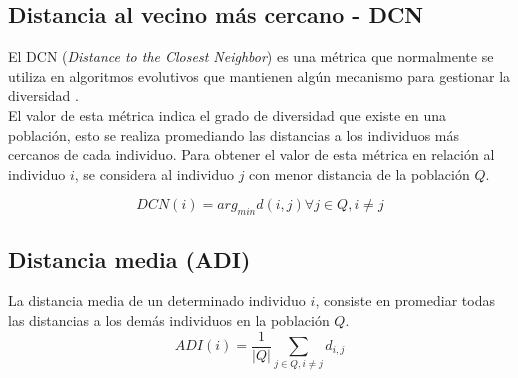 \subsection{Distancia al vecino más cercano - DCN}
El DCN (\textit{Distance to the Closest Neighbor}) es una métrica que normalmente se utiliza en algoritmos evolutivos que mantienen algún mecanismo para gestionar la diversidad \citep{Joel:DCN, Joel:MultiDynamic}.\\
El valor de esta métrica indica el grado de diversidad que existe en una población, esto se realiza promediando las distancias a los individuos más cercanos de cada individuo.
Para obtener el valor de esta métrica en relación al individuo $i$, se considera al individuo $j$ con menor distancia de la población $Q$.

\begin{equation}
DCN(i) = arg_{min} d(i,j ) \forall j \in Q, i \neq j
\end{equation}

\subsection{Distancia media (ADI)}
La distancia media  \citep{Joel:DCN, Joel:MultiDynamic} de un determinado individuo $i$, consiste en promediar todas las distancias a los demás individuos en la población $Q$.
\begin{equation}
ADI(i) = \frac{1}{|Q|} \sum_{j \in Q,  i \neq j}  d_{i,j}
\end{equation}

